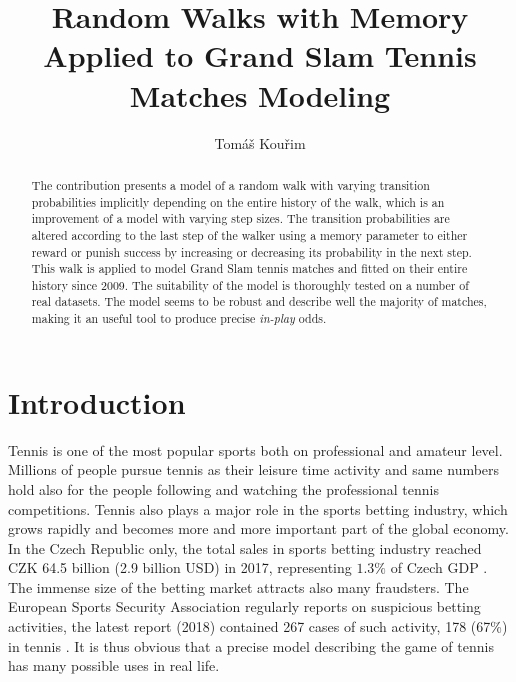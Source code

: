 \documentclass{easychair}
\title{Random Walks with Memory Applied to Grand Slam Tennis Matches Modeling}
\author{Tomáš Kouřim}
\institute{
  Institute of Information Theory and Automation, Czech Academy of Sciences
  Prague, Czech Republic\\
  \email{kourim@outlook.com}
 }
\begin{document}
\maketitle
\begin{abstract}
The contribution presents a model of a random walk with varying transition
probabilities implicitly depending on the entire history of the walk,
which is an improvement of a model with varying step sizes. The transition
probabilities are altered according to the last step of the walker
using a memory parameter to either reward or punish success by increasing
or decreasing its probability in the next step. This walk is applied
to model Grand Slam tennis matches and fitted on their entire history
since 2009. The suitability of the model is thoroughly tested on a
number of real datasets. The model seems to be robust and describe
well the majority of matches, making it an useful tool to produce
precise \emph{in-play} odds.
\end{abstract}

\setcounter{tocdepth}{2}
{\small
\tableofcontents}


\section{Introduction}

Tennis is one of the most popular sports both on professional and
amateur level. Millions of people pursue tennis as their leisure time
activity \cite{pac2019report} and same numbers hold also for the
people following and watching the professional tennis competitions.
Tennis also plays a major role in the sports betting industry, which
grows rapidly and becomes more and more important part of the global
economy. In the Czech Republic only, the total sales in sports betting
industry reached CZK 64.5 billion (2.9 billion USD) in 2017, representing
$1.3\%$ of Czech GDP \cite{mf2017report}. The immense size of the
betting market attracts also many fraudsters. The European Sports
Security Association regularly reports on suspicious betting activities,
the latest report (2018) contained 267 cases of such activity, 178
(67\%) in tennis \cite{essa2018fullreport}. It is thus obvious that
a precise model describing the game of tennis has many possible uses
in real life.
\end{document}
